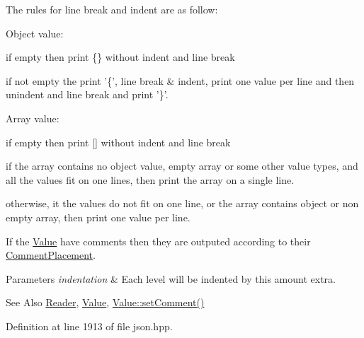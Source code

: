 The rules for line break and indent are as follow\-:
\begin{DoxyItemize}
\item Object value\-:
\begin{DoxyItemize}
\item if empty then print \{\} without indent and line break
\item if not empty the print '\{', line break \& indent, print one value per line and then unindent and line break and print '\}'.
\end{DoxyItemize}
\item Array value\-:
\begin{DoxyItemize}
\item if empty then print \mbox{[}\mbox{]} without indent and line break
\item if the array contains no object value, empty array or some other value types, and all the values fit on one lines, then print the array on a single line.
\item otherwise, it the values do not fit on one line, or the array contains object or non empty array, then print one value per line.
\end{DoxyItemize}
\end{DoxyItemize}

If the \hyperlink{class_json_1_1_value}{Value} have comments then they are outputed according to their \hyperlink{namespace_json_a4fc417c23905b2ae9e2c47d197a45351}{Comment\-Placement}.


\begin{DoxyParams}{Parameters}
{\em indentation} & Each level will be indented by this amount extra. \\
\hline
\end{DoxyParams}
\begin{DoxySeeAlso}{See Also}
\hyperlink{class_json_1_1_reader}{Reader}, \hyperlink{class_json_1_1_value}{Value}, \hyperlink{class_json_1_1_value_a29f3a30f7e5d3af6f38d57999bf5b480}{Value\-::set\-Comment()} 
\end{DoxySeeAlso}


Definition at line 1913 of file json.\-hpp.



